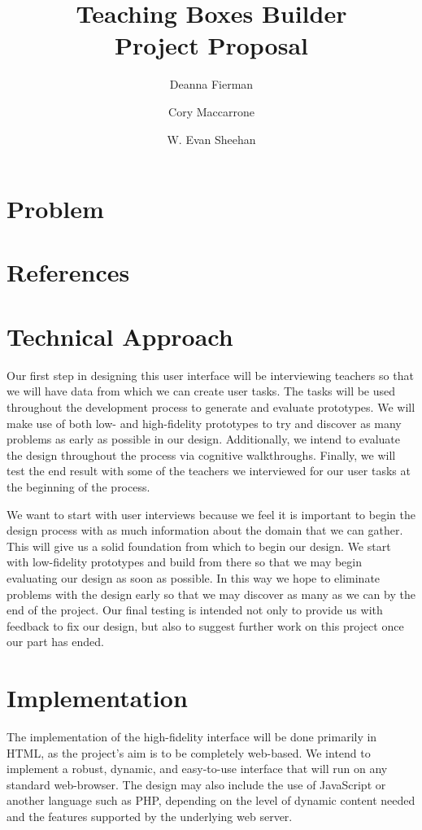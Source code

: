 \documentclass[11pt,letter]{article}
\title{Teaching Boxes Builder\\Project Proposal}
\author{Deanna Fierman \and Cory Maccarrone \and W. Evan Sheehan}
\begin{document}
\begin{titlepage}
	\maketitle
	\thispagestyle{empty}
\end{titlepage}

\section{Problem}

\section{References}

\section{Technical Approach}
Our first step in designing this user interface will be interviewing teachers so
that we will have data from which we can create user tasks. The tasks will be
used throughout the development process to generate and evaluate prototypes. We
will make use of both low- and high-fidelity prototypes to try and discover as
many problems as early as possible in our design. Additionally, we intend to
evaluate the design throughout the process via cognitive walkthroughs. Finally,
we will test the end result with some of the teachers we interviewed for our
user tasks at the beginning of the process.

We want to start with user interviews because we feel it is important to begin
the design process with as much information about the domain that we can gather.
This will give us a solid foundation from which to begin our design. We start
with low-fidelity prototypes and build from there so that we may begin
evaluating our design as soon as possible. In this way we hope to eliminate
problems with the design early so that we may discover as many as we can by the
end of the project. Our final testing is intended not only to provide us with
feedback to fix our design, but also to suggest further work on this project
once our part has ended.

\section{Implementation}
The implementation of the high-fidelity interface will be done primarily in
HTML, as the project's aim is to be completely web-based.  We intend to
implement a robust, dynamic, and easy-to-use interface that will run on any
standard web-browser.  The design may also include the use of JavaScript or
another language such as PHP, depending on the level of dynamic content needed
and the features supported by the underlying web server.
\end{document}
